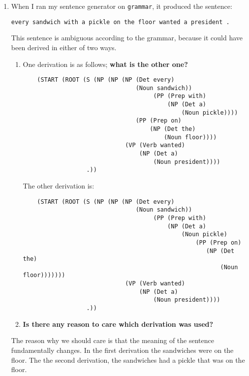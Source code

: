 \documentclass[10pt]{article}
\begin{document}
\begin{enumerate}
{\begin{verbatim}
\end{verbatim}
}

\item When I ran my sentence generator on \verb|grammar|, it produced
  the sentence:
\begin{verbatim}
every sandwich with a pickle on the floor wanted a president .
\end{verbatim}
\noindent
This sentence is ambiguous according to the grammar, because it could
have been derived in either of two ways.
\begin{enumerate}
\item  One derivation is as follows; {\bf what is the other one?}

\bigskip
\begin{verbatim}
    (START (ROOT (S (NP (NP (NP (Det every)
                                (Noun sandwich))
                                     (PP (Prep with)
                                         (NP (Det a)
                                             (Noun pickle))))
                                (PP (Prep on)
                                    (NP (Det the)
                                        (Noun floor))))
                             (VP (Verb wanted)
                                 (NP (Det a)
                                     (Noun president))))
                  .))
\end{verbatim}

The other derivation is: 

\bigskip
\begin{verbatim}
    (START (ROOT (S (NP (NP (NP (Det every)
                                (Noun sandwich))
                                     (PP (Prep with)
                                         (NP (Det a)
                                             (Noun pickle)
                                                 (PP (Prep on)
                                                    (NP (Det the)
                                                        (Noun floor)))))))
                             (VP (Verb wanted)
                                 (NP (Det a)
                                     (Noun president))))
                  .))
\end{verbatim}


\item {\bf Is there any reason to care which derivation was used?}
\end{enumerate}

The reason why we should care is that the meaning of the sentence fundamentally changes. In the first derivation the sandwiches were on the floor. The the second derivation, the sandwiches had a pickle that was on the floor.


\end{enumerate}
\end{document}
